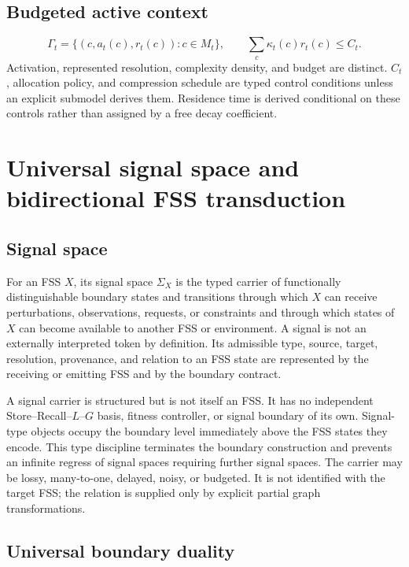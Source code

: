 \documentclass[11pt]{article}
\newcommand{\Sig}{\Sigma}
\begin{document}
\subsection{Budgeted active context}

\begin{equation}
\Gamma_t=\{(c,a_t(c),r_t(c)):c\in M_t\},\qquad
\sum_c\kappa_t(c)r_t(c)\le C_t.
\end{equation}
Activation, represented resolution, complexity density, and budget are distinct. $C_t$, allocation policy, and compression schedule are typed control conditions unless an explicit submodel derives them. Residence time is derived conditional on these controls rather than assigned by a free decay coefficient.

\section{Universal signal space and bidirectional FSS transduction}

\subsection{Signal space}

For an FSS $X$, its signal space $\Sig_X$ is the typed carrier of functionally distinguishable boundary states and transitions through which $X$ can receive perturbations, observations, requests, or constraints and through which states of $X$ can become available to another FSS or environment. A signal is not an externally interpreted token by definition. Its admissible type, source, target, resolution, provenance, and relation to an FSS state are represented by the receiving or emitting FSS and by the boundary contract.

A signal carrier is structured but is not itself an FSS. It has no independent Store--Recall--$L$--$G$ basis, fitness controller, or signal boundary of its own. Signal-type objects occupy the boundary level immediately above the FSS states they encode. This type discipline terminates the boundary construction and prevents an infinite regress of signal spaces requiring further signal spaces. The carrier may be lossy, many-to-one, delayed, noisy, or budgeted. It is not identified with the target FSS; the relation is supplied only by explicit partial graph transformations.

\subsection{Universal boundary duality}
\end{document}
